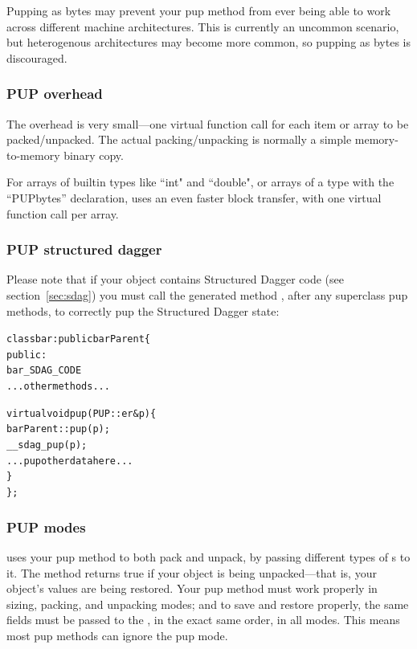 Pupping as bytes may prevent your pup method from ever being able to
work across different machine architectures.  This is currently
an uncommon scenario, but heterogenous architectures may become more
common, so pupping as bytes is discouraged.

\subsubsection{PUP overhead}

\label{sec:pupoverhead}

The  overhead is very small---one virtual function call
for each item or array to be packed/unpacked.  The actual packing/unpacking is
normally a simple memory-to-memory binary copy. 

For arrays of builtin types like ``int" and ``double", or arrays of a type 
with the ``PUPbytes'' declaration,  uses an even faster block 
transfer, with one virtual function call per array.


\subsubsection{PUP structured dagger}

\label{sec:pupsdag}

Please note that if your object contains Structured Dagger code (see section~\ref{sec:sdag}) you must call the generated method , after any superclass pup methods, to correctly pup the Structured Dagger state:

\begin{alltt}
class bar : public barParent \{
 public:
    bar_SDAG_CODE 
    ...other methods...

    virtual void pup(PUP::er& p) \{
      barParent::pup(p);
      __sdag_pup(p);
      ...pup other data here...
    \}
\};
\end{alltt}



\subsubsection{PUP modes}

\label{sec:pupmodes}

\charmpp{} uses your pup method to both pack and unpack, 
by passing different types of s to it.  The method
 returns true if your object is being unpacked---that 
is, your object's values are being restored.  Your pup method must
work properly in sizing, packing, and unpacking modes; and
to save and restore properly, the same fields must be passed 
to the , in the exact same order, in all modes.
This means most pup methods can ignore the pup mode.

